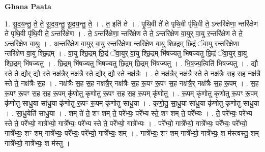 \documentclass[17pt]{extarticle}
\begin{document}
\textbf{Ghana Paata } \newline

1. सू॒द॒य॒न्तु॒ ते॒ ते॒ सू॒द॒य॒न्तु॒ सू॒द॒य॒न्तु॒ ते॒ । . त॒ इति॑ ते । . पृ॒थि॒वी ते॑ ते पृथि॒वी पृ॑थि॒वी ते॒ ऽन्तरि॑क्षेणा॒ न्तरि॑क्षेण ते पृथि॒वी पृ॑थि॒वी ते॒ ऽन्तरि॑क्षेण । . ते॒ ऽन्तरि॑क्षेणा॒ न्तरि॑क्षेण ते ते॒ ऽन्तरि॑क्षेण वा॒युर् वा॒यु र॒न्तरि॑क्षेण ते ते॒ ऽन्तरि॑क्षेण वा॒युः । . अ॒न्तरि॑क्षेण वा॒युर् वा॒यु र॒न्तरि॑क्षेणा॒ न्तरि॑क्षेण वा॒यु श्छि॒द्रम् छि॒द्रं ॅवा॒यु र॒न्तरि॑क्षेणा॒ न्तरि॑क्षेण वा॒यु श्छि॒द्रम् । . वा॒यु श्छि॒द्रम् छि॒द्रं ॅवा॒युर् वा॒यु श्छि॒द्रम् भि॑षज्यतु भिषज्यतु छि॒द्रं ॅवा॒युर् वा॒यु श्छि॒द्रम् भि॑षज्यतु । . छि॒द्रम् भि॑षज्यतु भिषज्यतु छि॒द्रम् छि॒द्रम् भि॑षज्यतु । . भि॒ष॒ज्य॒त्विति॑ भिषज्यतु । . द्यौ स्ते॑ ते॒ द्यौर् द्यौ स्ते॒ नक्ष॑त्रै॒र् नक्ष॑त्रै स्ते॒ द्यौर् द्यौ स्ते॒ नक्ष॑त्रैः । . ते॒ नक्ष॑त्रै॒र् नक्ष॑त्रै स्ते ते॒ नक्ष॑त्रैः स॒ह स॒ह नक्ष॑त्रै स्ते ते॒ नक्ष॑त्रैः स॒ह । . नक्ष॑त्रैः स॒ह स॒ह नक्ष॑त्रै॒र् नक्ष॑त्रैः स॒ह रू॒पꣳ रू॒पꣳ स॒ह नक्ष॑त्रै॒र् नक्ष॑त्रैः स॒ह रू॒पम् । . स॒ह रू॒पꣳ रू॒पꣳ स॒ह स॒ह रू॒पम् कृ॑णोतु कृणोतु रू॒पꣳ स॒ह स॒ह रू॒पम् कृ॑णोतु । . रू॒पम् कृ॑णोतु कृणोतु रू॒पꣳ रू॒पम् कृ॑णोतु साधु॒या सा॑धु॒या कृ॑णोतु रू॒पꣳ रू॒पम् कृ॑णोतु साधु॒या । . कृ॒णो॒तु॒ सा॒धु॒या सा॑धु॒या कृ॑णोतु कृणोतु साधु॒या । . सा॒धु॒येति॑ साधु॒या । . शम् ते॑ ते॒ शꣳ शम् ते॒ परे᳚भ्यः॒ परे᳚भ्य स्ते॒ शꣳ शम् ते॒ परे᳚भ्यः । . ते॒ परे᳚भ्यः॒ परे᳚भ्य स्ते ते॒ परे᳚भ्यो॒ गात्रे᳚भ्यो॒ गात्रे᳚भ्यः॒ परे᳚भ्य स्ते ते॒ परे᳚भ्यो॒ गात्रे᳚भ्यः । . परे᳚भ्यो॒ गात्रे᳚भ्यो॒ गात्रे᳚भ्यः॒ परे᳚भ्यः॒ परे᳚भ्यो॒ गात्रे᳚भ्यः॒ शꣳ शम् गात्रे᳚भ्यः॒ परे᳚भ्यः॒ परे᳚भ्यो॒ गात्रे᳚भ्यः॒ शम् । . गात्रे᳚भ्यः॒ शꣳ शम् गात्रे᳚भ्यो॒ गात्रे᳚भ्यः॒ श म॑स्त्वस्तु॒ शम् गात्रे᳚भ्यो॒ गात्रे᳚भ्यः॒ श म॑स्तु । \newline
\end{document}
